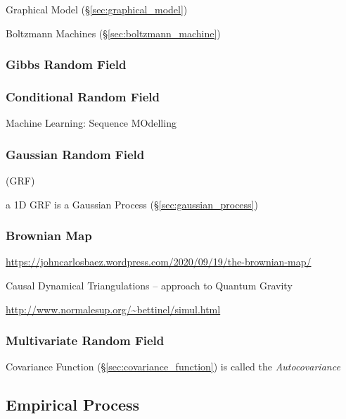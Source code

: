 Graphical Model (\S\ref{sec:graphical_model})

Boltzmann Machines (\S\ref{sec:boltzmann_machine})



\subsubsection{Gibbs Random Field}\label{sec:gibbs_random_field}

\subsubsection{Conditional Random Field}\label{sec:conditional_random_field}

Machine Learning: Sequence MOdelling



\subsubsection{Gaussian Random Field}\label{sec:gaussian_random_field}

(GRF)

a 1D GRF is a Gaussian Process (\S\ref{sec:gaussian_process})



\subsubsection{Brownian Map}\label{sec:brownian_map}

\url{https://johncarlosbaez.wordpress.com/2020/09/19/the-brownian-map/}

Causal Dynamical Triangulations -- approach to Quantum Gravity

\url{http://www.normalesup.org/~bettinel/simul.html}



\subsubsection{Multivariate Random Field}\label{sec:multivariate_random_field}


Covariance Function (\S\ref{sec:covariance_function}) is called the
\emph{Autocovariance}



\subsection{Empirical Process}\label{sec:empirical_process}

